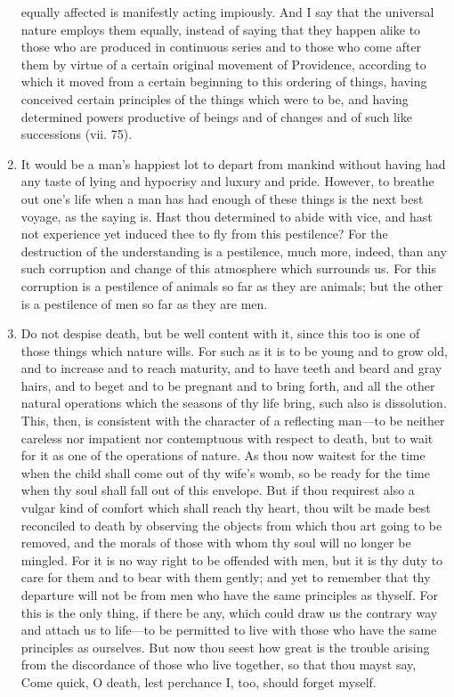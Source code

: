 \begin{enumerate}
equally affected is manifestly acting impiously. And I say that the universal nature employs them equally, instead of saying that they happen alike to those who are produced in continuous series and to those who come after them by virtue of a certain original movement of Providence, according to which it moved from a certain beginning to this ordering of things, having conceived certain principles of the things which were to be, and having determined powers productive of beings and of changes and of such like successions (vii. 75).

\item It would be a man's happiest lot to depart from mankind without having had any taste of lying and hypocrisy and luxury and pride. However, to breathe out one's life when a man has had enough of these things is the next best voyage, as the saying is. Hast thou determined to abide with vice, and hast not experience yet induced thee to fly from this pestilence? For the destruction of the understanding is a pestilence, much more, indeed, than any such corruption and change of this atmosphere which surrounds us. For this corruption is a pestilence of animals so far as they are animals; but the other is a pestilence of men so far as they are men.

\item Do not despise death, but be well content with it, since this too is one of those things which nature wills. For such as it is to be young and to grow old, and to increase and to reach maturity, and to have teeth and beard and gray hairs, and to beget and to be pregnant and to bring forth, and all the other natural operations which the seasons of thy life bring, such also is dissolution. This, then, is consistent with the character of a reflecting man—to be neither careless nor impatient nor contemptuous with respect to death, but to wait for it as one of the operations of nature. As thou now waitest for the time when the child shall come out of thy wife's womb, so be ready for the time when thy soul shall fall out of this envelope. But if thou requirest also a vulgar kind of comfort which shall reach thy heart, thou wilt be made best reconciled to death by observing the objects from which thou art going to be removed, and the morals of those with whom thy soul will no longer be mingled. For it is no way right to be offended with men, but it is thy duty to care for them and to bear with them gently; and yet to remember that thy departure will not be from men who have the same principles as thyself. For this is the only thing, if there be any, which could draw us the contrary way and attach us to life—to be permitted to live with those who have the same principles as ourselves. But now thou seest how great is the trouble arising from the discordance of those who live together, so that thou mayst say, Come quick, O death, lest perchance I, too, should forget myself.


\end{enumerate}
